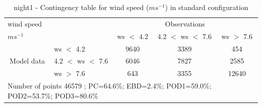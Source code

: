 \begin{table}[h!]
\begin{center}
\begin{tabular}{llccc}
\hline
{wind speed}                                       &                                                    & \multicolumn{3}{c}{Observations}                 \\
{$m s^{-1}$}                                       &                             & ws $<$ 4.2   & 4.2 $<$ ws $<$ 7.6 & ws $>$ 7.6 \\
\hline
\multicolumn{1}{c}{\multirow{3}{*}{Model data}}  & ws $<$ 4.2             & 9640                & 3389                       & 454              \\
                                                 & 4.2  $<$ ws $<$ 7.6 & 6046                & 7827                       & 2585              \\
                                                 & ws $>$ 7.6             & 643                & 3355                       & 12640              \\
\hline 
\multicolumn{5}{l}{ Number of points        46579 ; PC=64.6\%; EBD=2.4\%; POD1=59.0\%; POD2=53.7\%; POD3=80.6\%}                 \\
\end{tabular}
\end{center}
\caption{night1 - Contingency table for {wind speed} ($m s^{-1}$) in standard configuration}
\label{tab:contingencywsBEF:night1}
\end{table}
